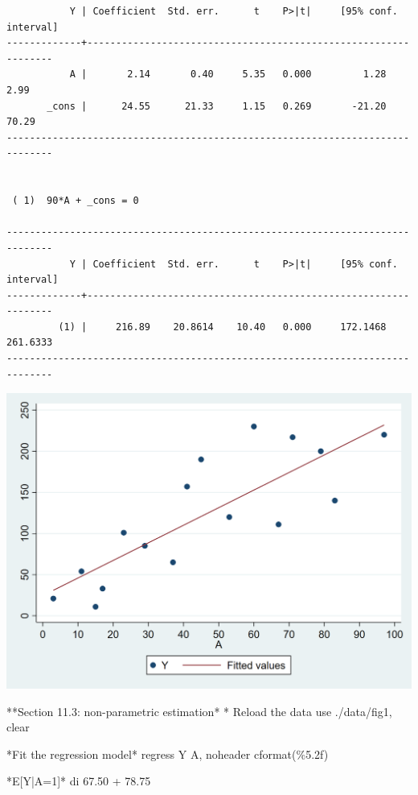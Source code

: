 \documentclass[
  10pt,
  a4paper,
]{book}
\newenvironment{Shaded}{\begin{snugshade}}{\end{snugshade}}
\newcommand{\KeywordTok}[1]{\textcolor[rgb]{0.00,0.46,0.62}{#1}}
\newcommand{\NormalTok}[1]{\textcolor[rgb]{0.00,0.46,0.62}{#1}}
\begin{document}
\begin{verbatim}
           Y | Coefficient  Std. err.      t    P>|t|     [95% conf. interval]
-------------+----------------------------------------------------------------
           A |       2.14       0.40     5.35   0.000         1.28        2.99
       _cons |      24.55      21.33     1.15   0.269       -21.20       70.29
------------------------------------------------------------------------------


 ( 1)  90*A + _cons = 0

------------------------------------------------------------------------------
           Y | Coefficient  Std. err.      t    P>|t|     [95% conf. interval]
-------------+----------------------------------------------------------------
         (1) |     216.89    20.8614    10.40   0.000     172.1468    261.6333
------------------------------------------------------------------------------
\end{verbatim}

\begin{center}\includegraphics[width=0.85\linewidth]{figs/stata-fig-11-4} \end{center}

\begin{Shaded}
\begin{Highlighting}[]
\NormalTok{**Section 11.3: non{-}parametric estimation*}
\NormalTok{* Reload the }\KeywordTok{data}
\KeywordTok{use}\NormalTok{ ./}\KeywordTok{data}\NormalTok{/fig1, }\KeywordTok{clear}

\NormalTok{*Fit the regression }\KeywordTok{model}\NormalTok{*}
\KeywordTok{regress}\NormalTok{ Y A, }\KeywordTok{noheader}\NormalTok{ cformat(\%5.2f)}

\NormalTok{*E[Y|A=1]*}
\KeywordTok{di}\NormalTok{ 67.50 + 78.75}
\end{Highlighting}
\end{Shaded}
\end{document}
